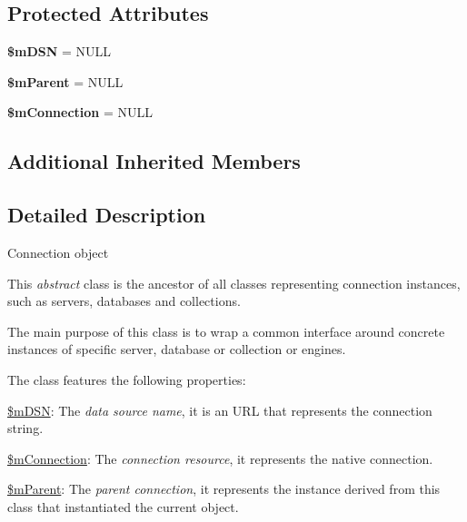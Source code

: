 \subsection*{Protected Attributes}
\begin{DoxyCompactItemize}
\item 
\hypertarget{class_ontology_wrapper_1_1_connection_object_a0d8f152694cf10d430028a25c1e981d3}{{\bfseries \$m\-D\-S\-N} = N\-U\-L\-L}\label{class_ontology_wrapper_1_1_connection_object_a0d8f152694cf10d430028a25c1e981d3}

\item 
\hypertarget{class_ontology_wrapper_1_1_connection_object_a1f0e856afbac9b6dc303d0365993ea78}{{\bfseries \$m\-Parent} = N\-U\-L\-L}\label{class_ontology_wrapper_1_1_connection_object_a1f0e856afbac9b6dc303d0365993ea78}

\item 
\hypertarget{class_ontology_wrapper_1_1_connection_object_a58126a003936b52fd4fbb69415bd66e4}{{\bfseries \$m\-Connection} = N\-U\-L\-L}\label{class_ontology_wrapper_1_1_connection_object_a58126a003936b52fd4fbb69415bd66e4}

\end{DoxyCompactItemize}
\subsection*{Additional Inherited Members}


\subsection{Detailed Description}
Connection object

This {\itshape abstract} class is the ancestor of all classes representing connection instances, such as servers, databases and collections.

The main purpose of this class is to wrap a common interface around concrete instances of specific server, database or collection or engines.

The class features the following properties\-:


\begin{DoxyItemize}
\item {\ttfamily \hyperlink{}{\$m\-D\-S\-N}}\-: The {\itshape data source name}, it is an U\-R\-L that represents the connection string. 
\item {\ttfamily \hyperlink{}{\$m\-Connection}}\-: The {\itshape connection resource}, it represents the native connection. 
\item {\ttfamily \hyperlink{}{\$m\-Parent}}\-: The {\itshape parent connection}, it represents the instance derived from this class that instantiated the current object. 
\end{DoxyItemize}

